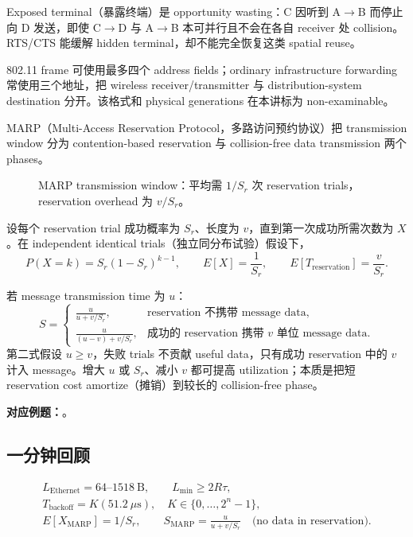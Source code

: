 Exposed terminal（暴露终端）是 opportunity wasting：C 因听到 A$\to$B 而停止向 D 发送，即使 C$\to$D 与 A$\to$B 本可并行且不会在各自 receiver 处 collision。RTS/CTS 能缓解 hidden terminal，却不能完全恢复这类 spatial reuse。

802.11 frame 可使用最多四个 address fields；ordinary infrastructure forwarding 常使用三个地址，把 wireless receiver/transmitter 与 distribution-system destination 分开。该格式和 physical generations 在本讲标为 non-examinable。


MARP（Multi-Access Reservation Protocol，多路访问预约协议）把 transmission window 分为 contention-based reservation 与 collision-free data transmission 两个 phases。

\begin{figure}[htbp]
  \centering
  \resizebox{0.94\textwidth}{!}{}
  \caption{MARP transmission window：平均需 $1/S_r$ 次 reservation trials，reservation overhead 为 $v/S_r$。}
  \label{fig:sc2008-l04-marp-window}
\end{figure}

设每个 reservation trial 成功概率为 $S_r$、长度为 $v$，直到第一次成功所需次数为 $X$。在 independent identical trials（独立同分布试验）假设下，
\[
  P(X=k)=S_r(1-S_r)^{k-1},
  \qquad
  \boxed{E[X]=\frac{1}{S_r}},
  \qquad
  \boxed{E[T_{\mathrm{reservation}}]=\frac{v}{S_r}}.
\]

若 message transmission time 为 $u$：
\[
\boxed{
  S=
  \begin{cases}
    \displaystyle\frac{u}{u+v/S_r},
      & \text{reservation 不携带 message data},\\[0.9em]
    \displaystyle\frac{u}{(u-v)+v/S_r},
      & \text{成功的 reservation 携带 $v$ 单位 message data}.
  \end{cases}}
\]
第二式假设 $u\ge v$，失败 trials 不贡献 useful data，只有成功 reservation 中的 $v$ 计入 message。增大 $u$ 或 $S_r$、减小 $v$ 都可提高 utilization；本质是把短 reservation cost amortize（摊销）到较长的 collision-free phase。

\textbf{对应例题：}。

\subsection{一分钟回顾}

\[
\boxed{
\begin{gathered}
L_{\mathrm{Ethernet}}=64\text{--}1518\ \text{B},\qquad
L_{\min}\ge2R\tau,\\
T_{\mathrm{backoff}}=K(51.2\ \mu\mathrm{s}),\quad
K\in\{0,\ldots,2^n-1\},\\
E[X_{\mathrm{MARP}}]=1/S_r,\qquad
S_{\mathrm{MARP}}=\frac{u}{u+v/S_r}
\quad\text{(no data in reservation)}.
\end{gathered}}
\]
